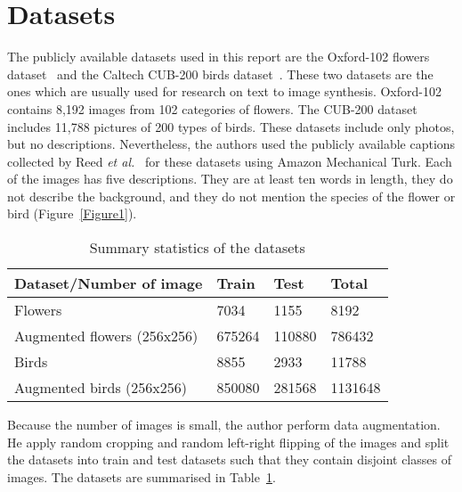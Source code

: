 \documentclass[10pt,twocolumn,letterpaper]{article}
\begin{document}
\section{Datasets}
The publicly available datasets used in this report are the Oxford-102 flowers dataset~\cite{name2} and the Caltech CUB-200 birds dataset~\cite{name3}. These two datasets are the ones which are usually used for research on text to image synthesis. Oxford-102 contains 8,192 images
from 102 categories of flowers. The CUB-200 dataset includes 11,788 pictures of 200 types
of birds. These datasets include only photos, but no descriptions. Nevertheless, the authors used the
publicly available captions collected by Reed \emph{et al.}~\cite{name4} for these datasets using Amazon Mechanical Turk. Each of the images has five descriptions. They are at least ten words in length, they do not describe the background, and they do not mention the species of the flower or bird (Figure~\ref{Figure1}).
  \begin{table}[!htbp]
  	\centering
  	\begin{tabular}{|p{2cm}|p{1cm}|p{1cm}|p{1cm}|}
   \hline  
  	Dataset/Number of image& Train & Test & Total \\
  		\hline
  	Flowers & 7034 & 1155 & 8192 \\
  	\hline
  	Augmented flowers (256x256) & 675264 & 110880 & 786432 \\
  		\hline 
  		Birds &8855 & 2933& 11788\\
  		\hline
  		Augmented birds (256x256)& 850080&281568 &1131648 \\
  		\hline
  	\end{tabular}
  	\caption{Summary statistics of the datasets} \label{T1}
  \end{table}
  Because the number of images is small, the author perform data augmentation. He apply random cropping and random left-right flipping of the images and split the datasets into train and test datasets such that they contain disjoint classes of images. The datasets are summarised in Table~\ref{T1}.
\end{document}
